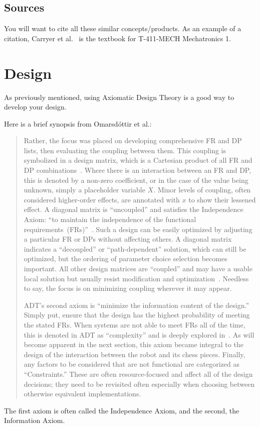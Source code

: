 \documentclass[sn-mathphys,pdflatex]{sn-jnl}%
\theoremstyle{thmstyleone}%
\theoremstyle{thmstyletwo}%
\theoremstyle{thmstylethree}%
\begin{document}
\subsection{Sources}\label{sec:sources}
You will want to cite all these similar concepts/products.
As an example of a citation, Carryer et al.~\cite{carryer2011IntroMechatronics} is the textbook for T-411-MECH Mechatronics 1.


\section{Design}\label{sec:design}
As previously mentioned, using Axiomatic Design Theory is a good way to develop your design.

Here is a brief synopsis from Omarsdóttir et al.\cite{omarsdottir2016chessmate}:
\begin{quotation}
  Rather, the focus was placed on developing comprehensive FR and DP lists, then evaluating the coupling between them.
  This coupling is symbolized in a design matrix, which is a Cartesian product of all FR and DP combinations~\cite{cochran2016msdd, benevides2012aed}.
Where there is an interaction between an FR and DP, this is denoted by a non-zero coefficient, or in the case of the value being unknown, simply a placeholder variable $X$.
Minor levels of coupling, often considered higher-order effects, are annotated with $x$ to show their lessened effect.
A diagonal matrix is ``uncoupled'' and satisfies the Independence Axiom: ``to maintain the independence of the functional requirements~(FRs)''~\cite{suh2001axiomatic}.
Such a design can be easily optimized by adjusting a particular FR or DPs without affecting others.
A diagonal matrix indicates a ``decoupled'' or ``path-dependent'' solution, which can still be optimized, but the ordering of parameter choice selection becomes important.
All other design matrices are ``coupled'' and may have a usable local solution but usually resist modification and optimization~\cite{suh2001axiomatic}.
Needless to say, the focus is on minimizing coupling wherever it may appear.

ADT's second axiom is ``minimize the information content of the design.''
Simply put, ensure that the design has the highest probability of meeting the stated FRs.
When systems are not able to meet FRs all of the time, this is denoted in ADT as ``complexity'' and is deeply explored in~\cite{suh2005complexity}.
As will become apparent in the next section, this axiom became integral to the design of the interaction between the robot and its chess pieces.
Finally, any factors to be considered that are not functional are categorized as ``Constraints.''
These are often resource-focused and affect all of the design decisions; they need to be revisited often especially when choosing between otherwise equivalent implementations.
\end{quotation}
The first axiom is often called the Independence Axiom, and the second, the Information Axiom.
\end{document}
